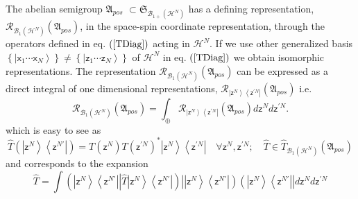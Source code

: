 \documentclass[aps,preprint]{revtex4}%
\begin{document}
The abelian semigroup $\mathfrak{A}_{pos}$ $\subset\mathfrak{S}_{\mathcal{B}%
_{1+}\left(  \mathcal{H}^{N}\right)  }$ has a defining representation,
$\mathcal{R}_{\mathcal{B}_{1}\left(  \mathcal{H}^{N}\right)  }\left(
\mathfrak{A}_{pos}\right)  $, in the space-spin coordinate representation,
through the operators defined in eq. $\left(  \ref{TDiag}\right)  $ acting in
$\mathcal{H}^{N}$. If we use other generalized basis $\left\{  \left\vert
\mathsf{x}_{1}\cdots\mathsf{x}_{N}\right\rangle \right\}  \neq\left\{
\left\vert \mathsf{z}_{1}\cdots\mathsf{z}_{N}\right\rangle \right\}  $ of
$\mathcal{H}^{N}$ in eq. $\left(  \ref{TDiag}\right)  $ we obtain isomorphic
representations. The representation $\mathcal{R}_{\mathcal{B}_{1}\left(
\mathcal{H}^{N}\right)  }\left(  \mathfrak{A}_{pos}\right)  $ can be expressed
as a direct integral of one dimensional representations, $\mathcal{R}%
_{\left\vert \mathsf{z}^{N}\right\rangle \left\langle \mathsf{z}^{\prime
N}\right\vert }\left(  \mathfrak{A}_{pos}\right)  $ i.e.%
\begin{equation}
\mathcal{R}_{\mathcal{B}_{1}\left(  \mathcal{H}^{N}\right)  }\left(
\mathfrak{A}_{pos}\right)  =\int_{\oplus}\mathcal{R}_{\left\vert
\mathsf{z}^{N}\right\rangle \left\langle \mathsf{z}^{\prime N}\right\vert
}\left(  \mathfrak{A}_{pos}\right)  d\mathsf{z}^{N}d\mathsf{z}^{\prime N}.
\end{equation}
which is easy to see as
\begin{equation}
\hat{T}\left(  \left\vert \mathsf{z}^{N}\right\rangle \left\langle
\mathsf{z}^{N\prime}\right\vert \right)  =T\left(  \mathsf{z}^{N}\right)
T\left(  \mathsf{z}^{\prime N}\right)  ^{\ast}\left\vert \mathsf{z}%
^{N}\right\rangle \left\langle \mathsf{z}^{\prime N}\right\vert \quad
\forall\mathsf{z}^{N},\mathsf{z}^{\prime N};\quad\hat{T}\in\hat{T}%
_{\mathcal{B}_{1}\left(  \mathcal{H}^{N}\right)  }\left(  \mathfrak{A}%
_{pos}\right)
\end{equation}
and corresponds to the expansion
\begin{equation}
\hat{T}=%
{\displaystyle\int}
\left(  \left\vert \mathsf{z}^{N}\right\rangle \left\langle \mathsf{z}%
^{N\prime}\right\vert \left\vert \hat{T}\right.  \left\vert \mathsf{z}%
^{N}\right\rangle \left\langle \mathsf{z}^{N\prime}\right\vert \right)
\left\vert \left\vert \mathsf{z}^{N}\right\rangle \left\langle \mathsf{z}%
^{N\prime}\right\vert \right)  \left(  \left\vert \mathsf{z}^{N}\right\rangle
\left\langle \mathsf{z}^{N\prime}\right\vert \right\vert d\mathsf{z}%
^{N}d\mathsf{z}^{\prime N} \label{upos}%
\end{equation}
\end{document}

